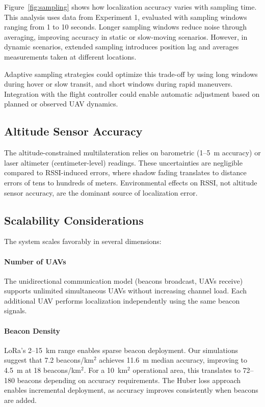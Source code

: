 \documentclass[master,final,11pt]{iscs-thesis}
\begin{document}
Figure~\ref{fig:sampling} shows how localization accuracy varies with sampling time. This analysis uses data from Experiment 1, evaluated with sampling windows ranging from 1 to 10 seconds.
Longer sampling windows reduce noise through averaging, improving accuracy in static or slow-moving scenarios.
However, in dynamic scenarios, extended sampling introduces position lag and averages measurements taken at different locations.

Adaptive sampling strategies could optimize this trade-off by using long windows during hover or slow transit, and short windows during rapid maneuvers.
Integration with the flight controller could enable automatic adjustment based on planned or observed UAV dynamics.

\subsection{Altitude Sensor Accuracy}

The altitude-constrained multilateration relies on barometric (1--5~m accuracy) or laser altimeter (centimeter-level) readings.
These uncertainties are negligible compared to RSSI-induced errors, where shadow fading translates to distance errors of tens to hundreds of meters.
Environmental effects on RSSI, not altitude sensor accuracy, are the dominant source of localization error.

\subsection{Scalability Considerations}

The system scales favorably in several dimensions:

\paragraph{Number of UAVs}
The unidirectional communication model (beacons broadcast, UAVs receive) supports unlimited simultaneous UAVs without increasing channel load.
Each additional UAV performs localization independently using the same beacon signals.

\paragraph{Beacon Density}
LoRa's 2--15~km range enables sparse beacon deployment.
Our simulations suggest that 7.2 beacons/km$^2$ achieves 11.6~m median accuracy, improving to 4.5~m at 18 beacons/km$^2$.
For a 10~km$^2$ operational area, this translates to 72--180 beacons depending on accuracy requirements.
The Huber loss approach enables incremental deployment, as accuracy improves consistently when beacons are added.
\end{document}
